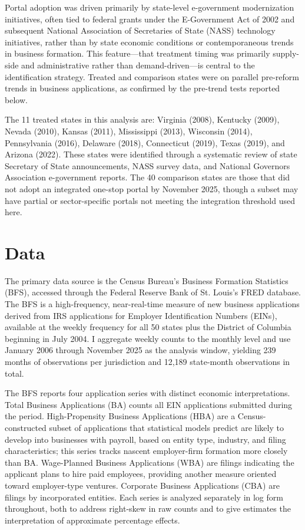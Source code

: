 \documentclass[12pt]{article}
\begin{document}
Portal adoption was driven primarily by state-level e-government modernization initiatives, often tied to federal grants under the E-Government Act of 2002 and subsequent National Association of Secretaries of State (NASS) technology initiatives, rather than by state economic conditions or contemporaneous trends in business formation. This feature---that treatment timing was primarily supply-side and administrative rather than demand-driven---is central to the identification strategy. Treated and comparison states were on parallel pre-reform trends in business applications, as confirmed by the pre-trend tests reported below.

The 11 treated states in this analysis are: Virginia (2008), Kentucky (2009), Nevada (2010), Kansas (2011), Mississippi (2013), Wisconsin (2014), Pennsylvania (2016), Delaware (2018), Connecticut (2019), Texas (2019), and Arizona (2022). These states were identified through a systematic review of state Secretary of State announcements, NASS survey data, and National Governors Association e-government reports. The 40 comparison states are those that did not adopt an integrated one-stop portal by November 2025, though a subset may have partial or sector-specific portals not meeting the integration threshold used here.

\section{Data}

The primary data source is the Census Bureau's Business Formation Statistics (BFS), accessed through the Federal Reserve Bank of St. Louis's FRED database. The BFS is a high-frequency, near-real-time measure of new business applications derived from IRS applications for Employer Identification Numbers (EINs), available at the weekly frequency for all 50 states plus the District of Columbia beginning in July 2004. I aggregate weekly counts to the monthly level and use January 2006 through November 2025 as the analysis window, yielding 239 months of observations per jurisdiction and 12,189 state-month observations in total.

The BFS reports four application series with distinct economic interpretations. Total Business Applications (BA) counts all EIN applications submitted during the period. High-Propensity Business Applications (HBA) are a Census-constructed subset of applications that statistical models predict are likely to develop into businesses with payroll, based on entity type, industry, and filing characteristics; this series tracks nascent employer-firm formation more closely than BA. Wage-Planned Business Applications (WBA) are filings indicating the applicant plans to hire paid employees, providing another measure oriented toward employer-type ventures. Corporate Business Applications (CBA) are filings by incorporated entities. Each series is analyzed separately in log form throughout, both to address right-skew in raw counts and to give estimates the interpretation of approximate percentage effects.
\end{document}
